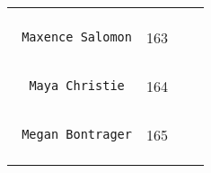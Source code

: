 \documentclass[]{article}
\begin{document}
\begin{longtable}[c]{@{}llll@{}}
\begin{minipage}[t]{0.13\columnwidth}
\end{minipage} & \begin{minipage}[t]{0.15\columnwidth}\raggedright
\end{minipage}
\\\noalign{\medskip}
\begin{minipage}[t]{0.39\columnwidth}\raggedright
\begin{verbatim}
 Maxence Salomon
\end{verbatim}
\end{minipage} & \begin{minipage}[t]{0.10\columnwidth}\raggedright
163
\end{minipage} & \begin{minipage}[t]{0.13\columnwidth}\raggedright
\end{minipage} & \begin{minipage}[t]{0.15\columnwidth}\raggedright
\end{minipage}
\\\noalign{\medskip}
\begin{minipage}[t]{0.39\columnwidth}\raggedright
\begin{verbatim}
  Maya Christie
\end{verbatim}
\end{minipage} & \begin{minipage}[t]{0.10\columnwidth}\raggedright
164
\end{minipage} & \begin{minipage}[t]{0.13\columnwidth}\raggedright
\end{minipage} & \begin{minipage}[t]{0.15\columnwidth}\raggedright
\end{minipage}
\\\noalign{\medskip}
\begin{minipage}[t]{0.39\columnwidth}\raggedright
\begin{verbatim}
 Megan Bontrager
\end{verbatim}
\end{minipage} & \begin{minipage}[t]{0.10\columnwidth}\raggedright
165
\end{minipage} & \begin{minipage}[t]{0.13\columnwidth}\raggedright
\end{minipage} & \begin{minipage}[t]{0.15\columnwidth}\raggedright
\end{minipage}
\\\noalign{\medskip}

\end{longtable}
\end{document}
